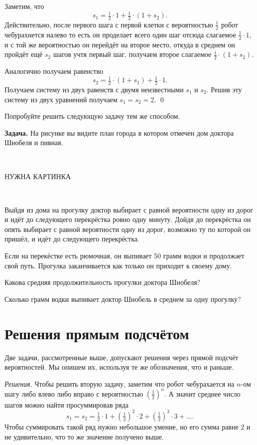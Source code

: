 \documentclass{article}
\begin{document}
Заметим, что 
\[s_1=\tfrac12\cdot1+\tfrac12\cdot (1+s_2).\]
Действительно, после первого шага с первой клетки
с вероятностью $\tfrac12$ робот чебурахнется налево то есть он проделает всего один шаг
отсюда слагаемое $\tfrac12\cdot1$,
и с той же вероятностью он перейдёт на второе место,
откуда в среднем он пройдёт ещё $s_2$ шагов
учтя первый шаг, получаем второе слагаемое $\tfrac12\cdot (1+s_2)$.

Аналогично получаем равенство
\[s_2=\tfrac12\cdot (1+s_1)+\tfrac12\cdot 1.\]
Получаем систему из двух равенств с двумя неизвестными $s_1$ и $s_2$.
Решив эту систему из двух уравнений получаем 
$s_1=s_2=2$.
\qed
\medskip

Попробуйте решить следующую задачу тем же способом.

\medskip
\noindent\textbf{Задача.}
На рисунке вы видите план города в котором отмечен дом доктора
Шнобеля и пивная.

\ 

НУЖНА КАРТИНКА

\ 

Выйдя из дома на прогулку доктор выбирает с равной вероятности 
одну из дорог и идёт до следующего перекрёстка ровно одну минуту.
Дойдя до перекрёстка он опять выбирает с равной вероятности 
одну из дорог, возможно ту по которой он пришёл, 
и идёт до следующего перекрёстка.

Если на перекёстке есть рюмочная, 
он выпивает 50 грамм водки и продолжает свой путь.
Прогулка заканчивается как только он приходит к своему дому.

Какова средняя продолжительность прогулки доктора Шнобеля?

Сколько грамм водки выпивает доктор Шнобель в среднем за одну прогулку? 

\section{Решения прямым подсчётом}

Две задачи, рассмотренные выше, допускают решения через прямой подсчёт вероятностей. 
Мы опишем их, используя те же обозначения, что и раньше.

\medskip
\noindent\textit{Решения.}
Чтобы решить вторую задачу, 
заметим что робот чебурахается на $n$-ом шагу либо влево либо вправо с вероятностью $(\tfrac12)^n$.
А значит среднее число шагов можно найти просуммировав ряда
\[s_1=s_2=\tfrac12\cdot1+(\tfrac12)^2\cdot 2+(\tfrac12)^3\cdot 3+\dots.\]
Чтобы суммировать такой ряд нужно небольшое умение, 
но его сумма равне $2$ и не удивительно, что то же значение получено выше.
\end{document}
